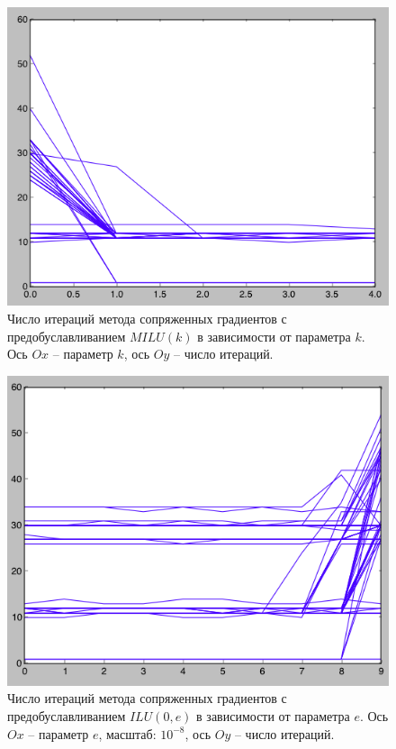 \begin{figure}[ht]
\includegraphics[width=\textwidth,height=\textheight,keepaspectratio]{milu_k}
\caption{Число итераций метода сопряженных градиентов с предобуславливанием $MILU(k)$ в зависимости от параметра $k$. Ось $Ox$ – параметр $k$, ось $Oy$ – число итераций.}
\end{figure}

\begin{figure}[ht]
\includegraphics[width=\textwidth,height=\textheight,keepaspectratio]{ilu_0_e}
\caption{Число итераций метода сопряженных градиентов с предобуславливанием $ILU(0, e)$ в зависимости от параметра $e$. Ось $Ox$ – параметр $e$, масштаб: $10^{-8}$, ось $Oy$ – число итераций.}
\end{figure}





